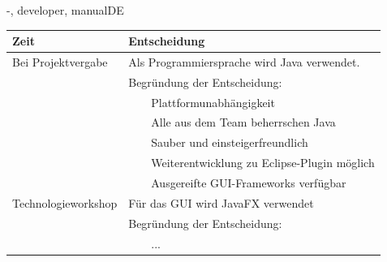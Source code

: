 \documentclass[twoside]{report}
\newcommand{\tabitem}{~~\llap{\textbullet}~~}
\begin{document}
\begin{shownto}{-, developer, manualDE}
\begin{table}[h]
\centering
\begin{tabular}{|l|l|}
\toprule
Zeit & Entscheidung \\
\midrule
Bei Projektvergabe & Als Programmiersprache wird Java verwendet.\\
& Begründung der Entscheidung:\\
&      \tabitem Plattformunabhängigkeit\\
&      \tabitem Alle aus dem Team beherrschen Java\\
&      \tabitem Sauber und einsteigerfreundlich\\
&      \tabitem Weiterentwicklung zu Eclipse-Plugin möglich\\
&      \tabitem Ausgereifte GUI-Frameworks verfügbar\\
\midrule
Technologieworkshop & Für das GUI wird JavaFX verwendet\\
& Begründung der Entscheidung:\\
&      \tabitem ...\\
\bottomrule
\end{tabular}
\end{table}
\nsecend


\nsecend %

\end{shownto} %
\end{document}
